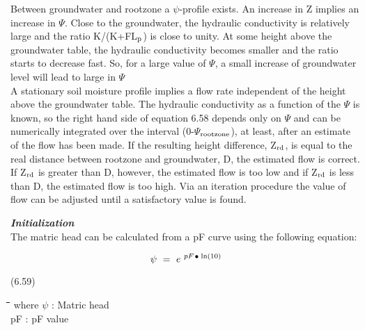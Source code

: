 \documentclass[11pt]{article}
\begin{document}
\bigskip
Between groundwater and rootzone a $\psi$-profile exists. An increase in Z implies an
increase in $\Psi$. Close to the groundwater, the hydraulic conductivity is relatively large and
the ratio K/(K+FL$_{{\rm p}}$) is close to unity. At some height above the groundwater table, the
hydraulic conductivity becomes smaller and the ratio starts to decrease fast. So, for a
large value of $\Psi$, a small increase of groundwater level will lead to large in $\Psi$\\
A stationary soil moisture profile implies a flow rate independent of the height above the
groundwater table. The hydraulic conductivity as a function of the $\Psi$ is known, so the
right hand side of equation 6.58 depends only on $\Psi$ and can be numerically integrated
over the interval (0-$\Psi$$_{{\rm rootzone}}$), at least, after an estimate of the flow has been made. If the
resulting height difference, Z$_{{\rm rd}}$, is equal to the real distance between rootzone and
groundwater, D, the estimated flow is correct. If Z$_{{\rm rd}}$ is greater than D, however, the
estimated flow is too low and if Z$_{{\rm rd}}$ is less than D, the estimated flow is too high. Via an
iteration procedure the value of flow can be adjusted until a satisfactory value is found.

\bigskip
\bigskip
\bigskip
\bigskip
\bigskip
{\bf {\it Initialization\/}}\\
The matric head can be calculated from a pF curve using the following equation:

\begin{displaymath}
\psi ~=~e ^{~pF\, {\rm \Bullet{0.75ex}}\, \ln (10)} 
\end{displaymath}

 \bigskip
\strut\hfill (6.59)
\nwln
\begin{tabbing}
\hspace{1.27cm}\=\hspace{1.27cm}\=\hspace{1.27cm}\=\hspace{1.27cm}\=%
\hspace{1.27cm}\=\hspace{1.27cm}\=\hspace{1.27cm}\=\hspace{1.27cm}\=%
\hspace{1.27cm}\=\hspace{1.27cm}\=\kill
where\> $\psi$\> : Matric head\> \> \> \> \> \> \> \> [cm]\\
\>pF\> : pF value\> \> \> \> \> \> \> \> [-]
\end{tabbing}
\end{document}
